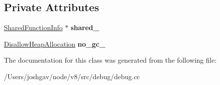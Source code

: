 \subsection*{Private Attributes}
\begin{DoxyCompactItemize}
\item 
\hyperlink{classv8_1_1internal_1_1_shared_function_info}{Shared\+Function\+Info} $\ast$ {\bfseries shared\+\_\+}\hypertarget{classv8_1_1internal_1_1_redirect_active_functions_ac8816cd2bbdf16611c2f6d777e46f4ef}{}\label{classv8_1_1internal_1_1_redirect_active_functions_ac8816cd2bbdf16611c2f6d777e46f4ef}

\item 
\hyperlink{classv8_1_1internal_1_1_per_thread_assert_scope_debug_only}{Disallow\+Heap\+Allocation} {\bfseries no\+\_\+gc\+\_\+}\hypertarget{classv8_1_1internal_1_1_redirect_active_functions_ab79859d07f657a3c9a1ea1c5fc92b188}{}\label{classv8_1_1internal_1_1_redirect_active_functions_ab79859d07f657a3c9a1ea1c5fc92b188}

\end{DoxyCompactItemize}


The documentation for this class was generated from the following file\+:\begin{DoxyCompactItemize}
\item 
/\+Users/joshgav/node/v8/src/debug/debug.\+cc\end{DoxyCompactItemize}
